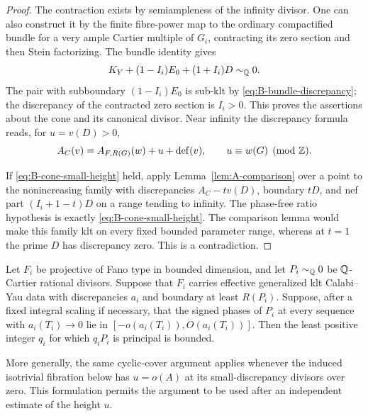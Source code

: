 \begin{proof}
The contraction exists by semiampleness of the infinity divisor.
One can also construct it by the finite fibre-power map to the
ordinary compactified bundle for a very ample Cartier multiple of
$G_i$, contracting its zero section and then Stein factorizing.
The bundle identity gives
\[
 K_Y+(1-I_i)E_0+(1+I_i)D\sim_{\mathbb Q}0.
\]
The pair with subboundary $(1-I_i)E_0$ is sub-klt by
\eqref{eq:B-bundle-discrepancy}; the discrepancy of the contracted
zero section is $I_i>0$.  This proves the assertions about the
cone and its canonical divisor.  Near infinity the discrepancy
formula reads, for $u=v(D)>0$,
\begin{equation}\label{eq:B-infinity-formula}
 A_C(v)=A_{F,R(G)}(w)+u+\operatorname{def}(v),
 \qquad u\equiv w(G)\pmod{\mathbb Z}.
\end{equation}

If \eqref{eq:B-cone-small-height} held, apply
Lemma~\ref{lem:A-comparison} over a point to the nonincreasing
family with discrepancies $A_C-tv(D)$, boundary $tD$, and nef part
$(I_i+1-t)D$ on a range tending to infinity.  The phase-free
ratio hypothesis is exactly \eqref{eq:B-cone-small-height}.
The comparison lemma would make this family klt on every fixed
bounded parameter range, whereas at $t=1$ the prime $D$ has
discrepancy zero.  This is a contradiction.
\end{proof}

\begin{lemma}\label{lem:B-principal-order}
Let $F_i$ be projective of Fano type in bounded dimension, and let
$P_i\sim_{\mathbb Q}0$ be $\mathbb Q$-Cartier rational divisors.  Suppose that
$F_i$ carries effective generalized klt Calabi--Yau data with
discrepancies $a_i$ and boundary at least $R(P_i)$.  Suppose,
after a fixed integral scaling if necessary, that the signed phases
of $P_i$ at every sequence with $a_i(T_i)\to0$ lie in
$[-o(a_i(T_i)),O(a_i(T_i))]$.  Then the least positive integer $q_i$
for which $q_iP_i$ is principal is bounded.

More generally, the same cyclic-cover argument applies whenever
the induced isotrivial fibration below has
$u=o(A)$ at its small-discrepancy divisors over zero.  This
formulation permits the argument to be used after an independent
estimate of the height $u$.
\end{lemma}

